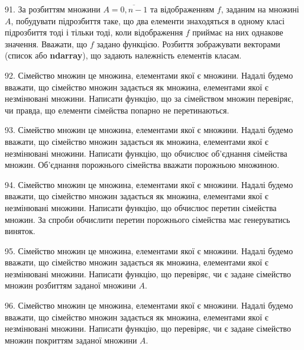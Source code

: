 \documentclass[10pt, ukrainian]{article}
\begin{document}
{\begin {Large}
91. За розбиттям множини $A=\overline{0,n-1}$ та відображенням $f$, заданим на множині $A$, побудувати підрозбиття таке, що два елементи знаходяться в одному класі підрозбиття тоді і тільки тоді, коли відображення $f$ приймає на них однакове значення. Вважати, що $f$ задано функцією. Розбиття зображувати векторами (список або  \textbf{ndarray}), що задають належність елементів класам.

92. Сімейство множин це множина, елементами якої є множини. Надалі будемо вважати, що сімейство множин задається як множина, елементами якої є незмінювані множини. Написати функцію, що за сімейством множин перевіряє, чи правда, що елементи сімейства попарно не перетинаються.

93. Сімейство множин це множина, елементами якої є множини. Надалі будемо вважати, що сімейство множин задається як множина, елементами якої є незмінювані множини. Написати функцію, що обчислює об'єднання сімейства множин. Об'єднання порожнього сімейства вважати порожньою множиною.

94. Сімейство множин це множина, елементами якої є множини. Надалі будемо вважати, що сімейство множин задається як множина, елементами якої є незмінювані множини. Написати функцію, що обчислює перетин сімейства множин. За спроби обчислити перетин порожнього сімейства має генеруватись виняток.

95. Сімейство множин це множина, елементами якої є множини. Надалі будемо вважати, що сімейство множин задається як множина, елементами якої є незмінювані множини. Написати функцію, що перевіряє, чи є задане сімейство множин розбиттям заданої множини $A$.

\newpage

96. Сімейство множин це множина, елементами якої є множини. Надалі будемо вважати, що сімейство множин задається як множина, елементами якої є незмінювані множини. Написати функцію, що перевіряє, чи є задане сімейство множин покриттям заданої множини $A$.




\end {Large}}
\end{document}
